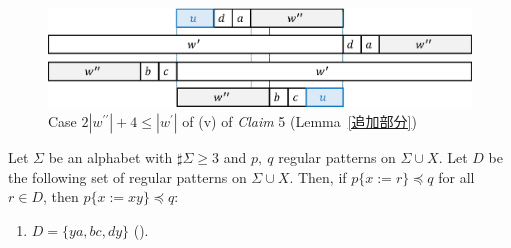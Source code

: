\begin{figure}[t]
\begin{center}
  \includegraphics[scale=0.45]{figs/w=2w_1+4.eps}
  \caption{Case $2|w^{\prime\prime}| + 4 \leq |w^{\prime}|$ of (v) of \textit{Claim} 5 (Lemma~\ref{追加部分})}\label{2w1+5}
\end{center}
\end{figure}

\begin{lem}\label{追加部分}
  Let $\Sigma$ be an alphabet with $\sharp\Sigma \ge 3$ and $p,~q$ regular patterns on $\Sigma\cup X$.
  Let $D$ be the following set of regular patterns on $\Sigma\cup X$.
  Then, if $p \{ x := r \} \preceq q$ for all $r \in D$, then $p \{ x := xy \} \preceq q$:
  \begin{enumerate}
  \item[] $D = \{ ya, bc, dy \}$ (\TheConditionA).
  \end{enumerate}
\end{lem}

